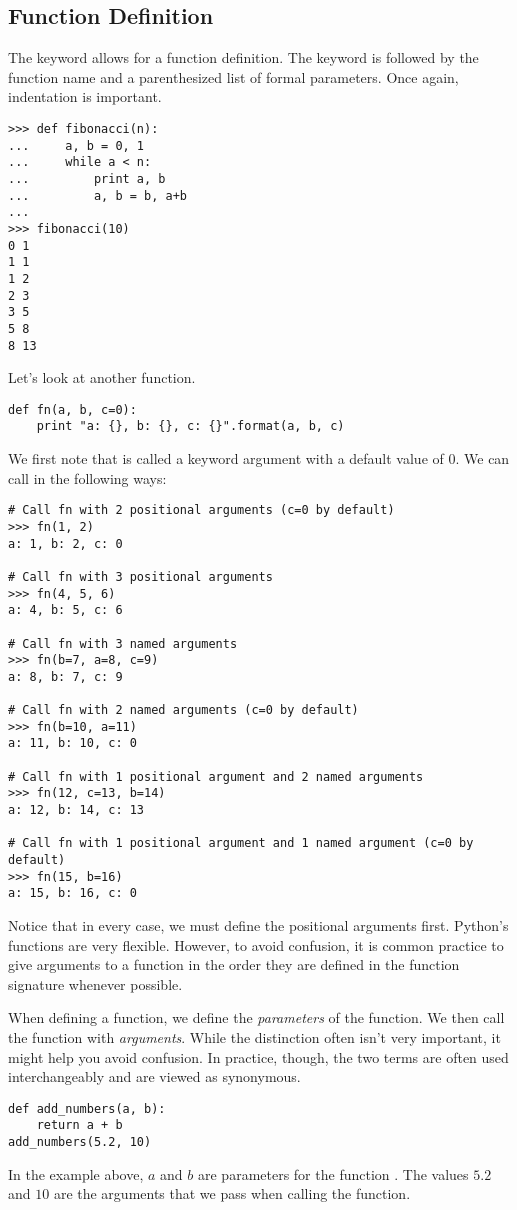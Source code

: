 \subsection*{Function Definition}
\begin{example}

The  keyword allows for a function definition. The keyword is followed by 
the function name and a parenthesized list of formal parameters.
Once again, indentation is important. 
\begin{lstlisting}
>>> def fibonacci(n):
...     a, b = 0, 1
...     while a < n:
...         print a, b
...         a, b = b, a+b
...         
>>> fibonacci(10)
0 1
1 1
1 2
2 3
3 5
5 8
8 13
\end{lstlisting}

Let's look at another function.
\begin{lstlisting}
def fn(a, b, c=0):
    print "a: {}, b: {}, c: {}".format(a, b, c)
\end{lstlisting}
We first note that  is called a keyword argument with a default value of 0.
We can call  in the following ways:
\begin{lstlisting}
# Call fn with 2 positional arguments (c=0 by default)
>>> fn(1, 2)
a: 1, b: 2, c: 0

# Call fn with 3 positional arguments
>>> fn(4, 5, 6)
a: 4, b: 5, c: 6

# Call fn with 3 named arguments
>>> fn(b=7, a=8, c=9)
a: 8, b: 7, c: 9

# Call fn with 2 named arguments (c=0 by default)
>>> fn(b=10, a=11)
a: 11, b: 10, c: 0

# Call fn with 1 positional argument and 2 named arguments
>>> fn(12, c=13, b=14)
a: 12, b: 14, c: 13

# Call fn with 1 positional argument and 1 named argument (c=0 by default)
>>> fn(15, b=16)
a: 15, b: 16, c: 0
\end{lstlisting}
Notice that in every case, we must define the positional arguments first.
Python's functions are very flexible.
However, to avoid confusion, it is common practice to give arguments to a function in the order they are defined in the function signature whenever possible.

\begin{info}
When defining a function, we define the \emph{parameters} of the function.  We then call the function with \emph{arguments}.
While the distinction often isn't very important, it might help you avoid confusion.
In practice, though, the two terms are often used interchangeably and are viewed as synonymous.
\begin{lstlisting}
def add_numbers(a, b):
    return a + b
add_numbers(5.2, 10)
\end{lstlisting}
In the example above, $a$ and $b$ are parameters for the function .
The values $5.2$ and $10$ are the arguments that we pass when calling the function.
\end{info}


\end{example}
